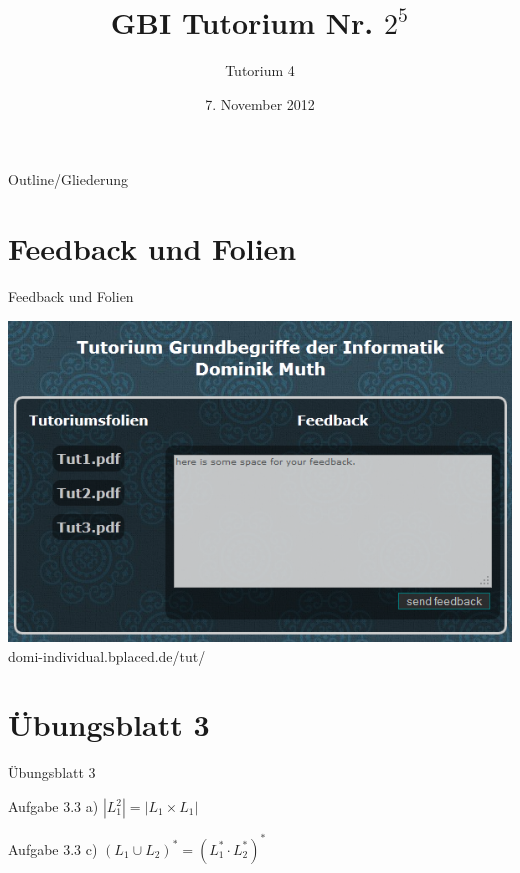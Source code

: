

\title[Tutorium 4]{GBI Tutorium Nr. $2^5$}
\subtitle{Tutorium 4}
\date{7. November 2012}






	\begin{frame}
		\titlepage
	\end{frame}

	\begin{frame}{Outline/Gliederung}
		\tableofcontents
	\end{frame}
	
	
	\section{Feedback und Folien}
	\begin{frame} {Feedback und Folien}
		\begin{center}
			\includegraphics[scale=.6]{graphics/03/feedback.png}\\
			\small domi-individual.bplaced.de/tut/
		\end{center}
	\end{frame}
	
	
	\section{\"Ubungsblatt 3}
	\begin{frame} {Übungsblatt 3}
		\begin{block} {Aufgabe 3.3 a)}
			$|L_1^2| = |L_1 \times L_1|$
		\end{block}
		\pause
		\begin{block} {Aufgabe 3.3 c)}
			$(L_1 \cup L_2)^* = (L_1^* \cdot L_2^*)^*$
		\end{block}
	\end{frame}	
		

